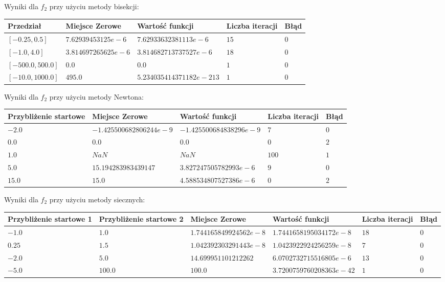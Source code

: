 \documentclass{article}
\begin{document}
\vspace{1.0cm}
Wyniki dla $f_2$ przy użyciu metody bisekcji:
\begin{center}
	\begin{tabular}{|p{3cm}|p{3.5cm}|p{4cm}|p{3cm}|p{2cm}|} \hline
		\textbf{Przedział} & \textbf{Miejsce Zerowe} & \textbf{Wartość funkcji} & \textbf{Liczba iteracji} & \textbf{Błąd} \\
		\hline
		$[-0.25,0.5]$ & $7.62939453125e-6$ & $7.62933632381113e-6$ & $15$ & $0$  \\
		\hline
		$[-1.0,4.0]$ & $3.814697265625e-6$ & $3.814682713737527e-6$ & $18$ & $0$ \\
		\hline
		$[-500.0,500.0]$ & $0.0$ & $0.0$ & $1$ & $0$  \\
		\hline
		$[-10.0,1000.0]$ & $495.0$ & $5.234035414371182e-213$ & $1$ & $0$ \\
		\hline
	\end{tabular}
\end{center}
Wyniki dla $f_2$ przy użyciu metody Newtona:
\begin{center}
	\begin{tabular}{|p{3cm}|p{4cm}|p{4cm}|p{3.5cm}|p{1cm}|} \hline
		\textbf{Przybliżenie startowe} & \textbf{Miejsce Zerowe} & \textbf{Wartość funkcji} & \textbf{Liczba iteracji} & \textbf{Błąd} \\
		\hline
		$-2.0$ & $-1.425500682806244e-9$ & $-1.425500684838296e-9$ & $7$ & $0$ \\
		\hline
		$0.0$ & $0.0$ & $0.0$ & $0$ & $2$  \\
		\hline
		$1.0$ & $NaN$ & $NaN$ & $100$ & $1$ \\
		\hline
		$5.0$ & $15.194283983439147$ & $3.827247505782993e-6$ & $9$ & $0$  \\
		\hline
		$15.0$ & $15.0$ & $4.588534807527386e-6$ & $0$ & $2$  \\
		\hline
	\end{tabular}
\end{center}
Wyniki dla $f_2$ przy użyciu metody siecznych:
\begin{center}
	\begin{tabular}{|p{2cm}|p{2cm}|p{3.8cm}|p{4cm}|p{2.5cm}|p{.8cm}|} \hline
		\textbf{Przybliżenie startowe 1} & \textbf{Przybliżenie startowe 2} & \textbf{Miejsce Zerowe} & \textbf{Wartość funkcji} & \textbf{Liczba iteracji} & \textbf{Błąd} \\
		\hline
		$-1.0$ & $1.0$ & $1.744165849924562e-8$ & $1.7441658195034172e-8$ & $18$ & $0$  \\
		\hline
		$0.25$ & $1.5$ & $1.042392303291443e-8$ & $1.0423922924256259e-8$ & $7$ & $0$  \\
		\hline
		$-2.0$ & $5.0$ & $14.699951101212262$ & $6.0702732715516805e-6$ & $13$ & $0$  \\
		\hline
		$-5.0$ & $100.0$ & $100.0$ & $3.7200759760208363e-42$ & $1$ & $0$  \\
		\hline
	\end{tabular}
\end{center}
\end{document}
